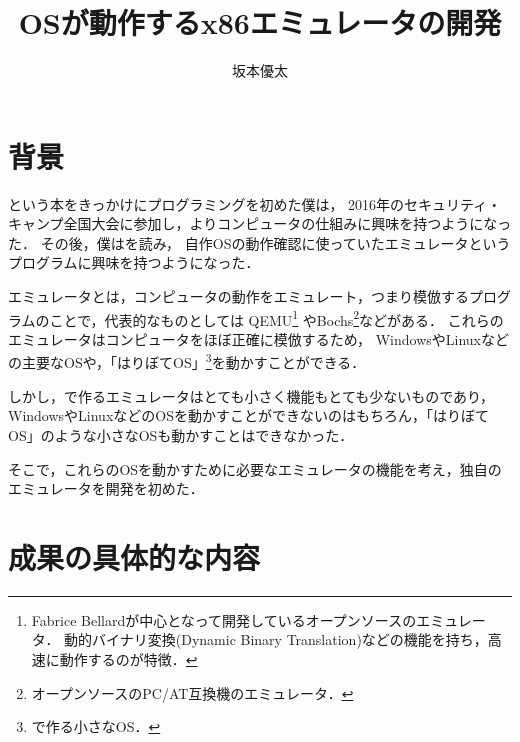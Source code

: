\documentclass[10pt,a4j]{jsarticle}
\title{\vspace{-4cm}OSが動作するx86エミュレータの開発}
\author{坂本優太}
\date{}
\begin{document}
\maketitle


\section{背景}
\cite[30日でできる！ OS自作入門]{30days-osdev}という本をきっかけにプログラミングを初めた僕は，
2016年のセキュリティ・キャンプ全国大会に参加し，よりコンピュータの仕組みに興味を持つようになった．
その後，僕は\cite[自作エミュレータで学ぶx86アーキテクチャ]{learn-x86-by-emu}を読み，
自作OSの動作確認に使っていたエミュレータというプログラムに興味を持つようになった．

エミュレータとは，コンピュータの動作をエミュレート，つまり模倣するプログラムのことで，代表的なものとしては
QEMU\footnote{Fabrice Bellardが中心となって開発しているオープンソースのエミュレータ．
動的バイナリ変換(Dynamic Binary Translation)などの機能を持ち，高速に動作するのが特徴．}
やBochs\footnote{オープンソースのPC/AT互換機のエミュレータ．}などがある．
これらのエミュレータはコンピュータをほぼ正確に模倣するため，
WindowsやLinuxなどの主要なOSや，「はりぼてOS」\footnote{\cite{30days-osdev}で作る小さなOS．}を動かすことができる．

しかし，\cite{learn-x86-by-emu}で作るエミュレータはとても小さく機能もとても少ないものであり，
WindowsやLinuxなどのOSを動かすことができないのはもちろん，「はりぼてOS」のような小さなOSも動かすことはできなかった．

そこで，これらのOSを動かすために必要なエミュレータの機能を考え，独自のエミュレータを開発を初めた．

\section{成果の具体的な内容}
\end{document}
